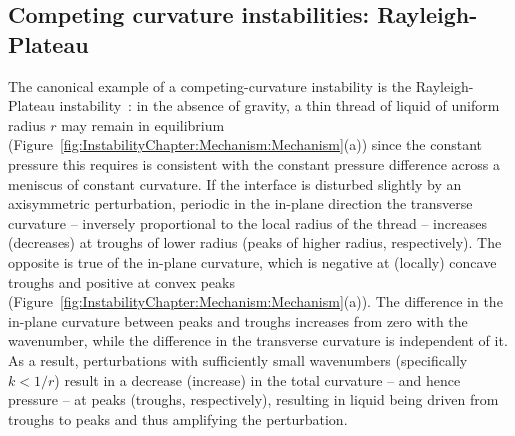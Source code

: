 \subsection{Competing curvature instabilities: Rayleigh-Plateau}

The canonical example of a competing-curvature instability is the Rayleigh-Plateau instability~\citep{Plateau1873, Rayleigh1879PRSL, Rayleigh1892PhilosMag}: in the absence of gravity, a thin thread of liquid of uniform radius $r$  may remain in equilibrium (Figure~\ref{fig:InstabilityChapter:Mechanism:Mechanism}(a)) since the constant pressure this requires is consistent with the constant pressure difference across a meniscus of constant curvature.
If the interface is disturbed slightly by an axisymmetric perturbation, periodic in the in-plane direction the transverse curvature -- inversely proportional to the local radius of the thread -- increases (decreases) at troughs of lower radius (peaks of higher radius, respectively). The opposite is true of the in-plane curvature, which is negative at (locally) concave troughs and positive at convex peaks (Figure~\ref{fig:InstabilityChapter:Mechanism:Mechanism}(a)). The difference in the in-plane curvature between peaks and troughs increases from zero with the wavenumber, while the difference in the transverse curvature is independent of it.  As a result, perturbations with sufficiently small wavenumbers (specifically $k < 1/r$) result in a decrease (increase) in the total curvature -- and hence pressure -- at peaks (troughs, respectively), resulting in liquid being driven from troughs to peaks and thus amplifying the perturbation.

